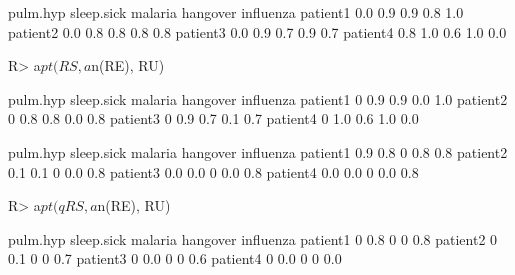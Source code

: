 \documentclass{article}\usepackage[]{graphicx}\usepackage[]{color}
\begin{document}
\begin{Schunk}
% --begin: "comp.circ.unavoid"
\begin{Soutput}
         pulm.hyp sleep.sick malaria hangover influenza
patient1      0.0        0.9     0.9      0.8       1.0
patient2      0.0        0.8     0.8      0.8       0.8
patient3      0.0        0.9     0.7      0.9       0.7
patient4      0.8        1.0     0.6      1.0       0.0
\end{Soutput}
%
% --end: "comp.circ.unavoid"
\end{Schunk}

\begin{Schunk}
% --begin: "comp.circ.excl.unavoid"
\begin{Sinput}
R> a$pt(RS, a$n(RE), RU)
\end{Sinput}
\begin{Soutput}
         pulm.hyp sleep.sick malaria hangover influenza
patient1        0        0.9     0.9      0.0       1.0
patient2        0        0.8     0.8      0.0       0.8
patient3        0        0.9     0.7      0.1       0.7
patient4        0        1.0     0.6      1.0       0.0
\end{Soutput}
%
% --end: "comp.circ.excl.unavoid"
\end{Schunk}

\begin{Schunk}
% --begin: "comp.quant.atleast"
\begin{Soutput}
         pulm.hyp sleep.sick malaria hangover influenza
patient1      0.9        0.8       0      0.8       0.8
patient2      0.1        0.1       0      0.0       0.8
patient3      0.0        0.0       0      0.0       0.8
patient4      0.0        0.0       0      0.0       0.8
\end{Soutput}
%
% --end: "comp.quant.atleast"
\end{Schunk}


\begin{Schunk}
% --begin: "comp.quant.combined"
\begin{Sinput}
R> a$pt(qRS, a$n(RE), RU)
\end{Sinput}
\begin{Soutput}
         pulm.hyp sleep.sick malaria hangover influenza
patient1        0        0.8       0        0       0.8
patient2        0        0.1       0        0       0.7
patient3        0        0.0       0        0       0.6
patient4        0        0.0       0        0       0.0
\end{Soutput}
%
% --end: "comp.quant.combined"
\end{Schunk}
\end{document}
